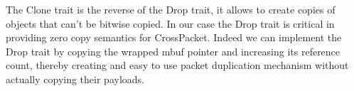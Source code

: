 

The Clone trait is the reverse of the Drop trait, it allows to create
copies of objects that can't be bitwise copied. In our case the Drop
trait is critical in providing zero copy semantics for
CrossPacket. Indeed we can implement the Drop trait by copying the
wrapped mbuf pointer and increasing its reference count, thereby
creating and easy to use packet duplication mechanism without actually
copying their payloads.


